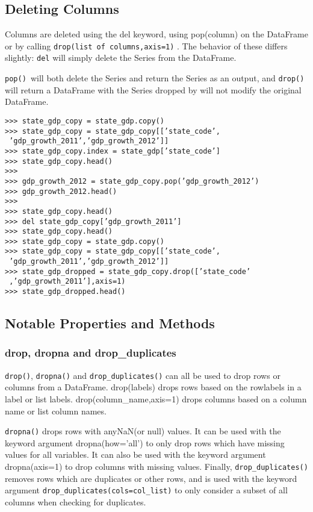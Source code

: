 \documentclass[KSmain.tex]{subfiles}
\begin{document}
\subsection{Deleting Columns}
Columns are deleted using the del keyword, using pop(column) on the DataFrame or by calling \texttt{drop(list
of columns,axis=1)} . The behavior of these differs slightly: \texttt{del} will simply delete the Series from the
DataFrame. 

\noindent \texttt{pop() }will both delete the Series and return the Series as an output, and \texttt{drop() }will return a
DataFrame with the Series dropped by will not modify the original DataFrame.
\begin{framed}
\begin{verbatim}
>>> state_gdp_copy = state_gdp.copy()
>>> state_gdp_copy = state_gdp_copy[[’state_code’,
 ’gdp_growth_2011’,’gdp_growth_2012’]]
>>> state_gdp_copy.index = state_gdp[’state_code’]
>>> state_gdp_copy.head()
>>>
>>> gdp_growth_2012 = state_gdp_copy.pop(’gdp_growth_2012’)
>>> gdp_growth_2012.head()
>>>
>>> state_gdp_copy.head()
>>> del state_gdp_copy[’gdp_growth_2011’]
>>> state_gdp_copy.head()
>>> state_gdp_copy = state_gdp.copy()
>>> state_gdp_copy = state_gdp_copy[[’state_code’,
 ’gdp_growth_2011’,’gdp_growth_2012’]]
>>> state_gdp_dropped = state_gdp_copy.drop([’state_code’
 ,’gdp_growth_2011’],axis=1)
>>> state_gdp_dropped.head()

\end{verbatim}
\end{framed}

\subsection{Notable Properties and Methods}
\subsubsection*{drop, dropna and drop\_duplicates}
\texttt{drop()}, \texttt{dropna()} and \texttt{drop\_duplicates()} can all be used to drop rows or columns from a DataFrame.
drop(labels) drops rows based on the rowlabels in a label or list labels. drop(column\_name,axis=1) drops
columns based on a column name or list column names.

\texttt{dropna()} drops rows with anyNaN(or null) values. It can be used with the keyword argument dropna(how=’all’)
to only drop rows which have missing values for all variables. It can also be used with the keyword argument
dropna(axis=1) to drop columns with missing values. Finally, \texttt{drop\_duplicates()} removes rows
which are duplicates or other rows, and is used with the keyword argument \texttt{drop\_duplicates(cols=col\_list)}
to only consider a subset of all columns when checking for duplicates.
\end{document}
